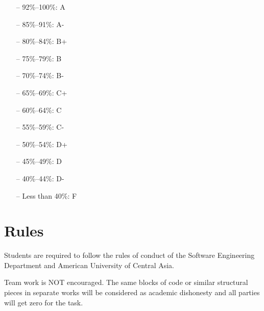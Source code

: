 \documentclass[12pt,a4paper,oneside]{article}
\begin{document}
        \begin{itemize} \itemsep-10pt \parskip0pt 
            \item[--] 92\%--100\%: A\\
            \item[--] 85\%--91\%: A-\\
            \item[--] 80\%--84\%: B+\\
            \item[--] 75\%--79\%: B\\
            \item[--] 70\%--74\%: B-\\
            \item[--] 65\%--69\%: C+\\
            \item[--] 60\%--64\%: C\\
            \item[--] 55\%--59\%: C-\\
            \item[--] 50\%--54\%: D+\\
            \item[--] 45\%--49\%: D\\
            \item[--] 40\%--44\%: D-\\
            \item[--] Less than 40\%: F
        \end{itemize}

    \section{Rules}

        Students are required to follow the rules of conduct of the Software
        Engineering Department and American University of Central Asia.

        Team work is NOT encouraged. The same blocks of code or similar
        structural pieces in separate works will be considered as academic
        dishonesty and all parties will get zero for the task.
\end{document}
